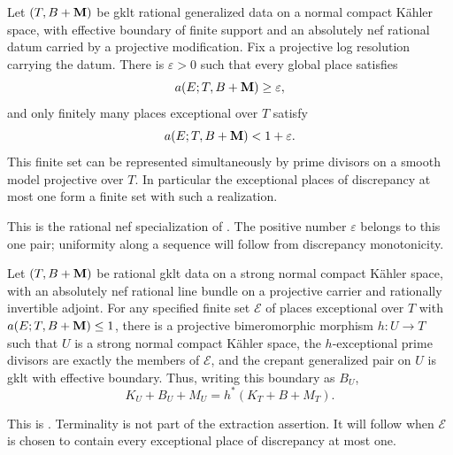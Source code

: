 \begin{proposition}\label{prop:low-places}
Let \((T,B+\mathbf{M})\) be gklt rational generalized data on a normal compact
K\"ahler space, with effective boundary of finite support and an absolutely
nef rational datum carried by a projective modification.  Fix a projective
log resolution carrying the datum.  There is \(\varepsilon>0\) such that
every global place satisfies
\[
 a(E;T,B+\mathbf{M})\geq\varepsilon,
\]
and only finitely many places exceptional over \(T\) satisfy
\[
 a(E;T,B+\mathbf{M})<1+\varepsilon.
\]
This finite set can be represented simultaneously by prime divisors on a
smooth model projective over \(T\).  In particular the exceptional places
of discrepancy at most one form a finite set with such a realization.
\end{proposition}

This is the rational nef specialization of
\cite[Lemma~4.2(i)]{KahlerAuxiliary}.  The positive number
\(\varepsilon\) belongs to this one pair; uniformity along a sequence will
follow from discrepancy monotonicity.

\begin{proposition}\label{prop:extraction}
Let \((T,B+\mathbf{M})\) be rational gklt data on a strong normal compact
K\"ahler space, with an absolutely nef rational line bundle on a projective
carrier and rationally invertible adjoint.  For any specified finite set
\(\mathcal E\) of places exceptional over \(T\) with
\(a(E;T,B+\mathbf{M})\leq1\), there is a projective bimeromorphic morphism
\(h:U\to T\) such that \(U\) is a strong normal compact K\"ahler space,
the \(h\)-exceptional prime divisors are exactly the members of
\(\mathcal E\), and the crepant generalized pair on \(U\) is gklt with
effective boundary.  Thus, writing this boundary as \(B_U\),
\[
 K_U+B_U+M_U=h^*(K_T+B+M_T).
\]
\end{proposition}

This is \cite[Proposition~9.11]{KahlerAuxiliary}.  Terminality is not part
of the extraction assertion.  It will follow when \(\mathcal E\) is chosen
to contain every exceptional place of discrepancy at most one.

